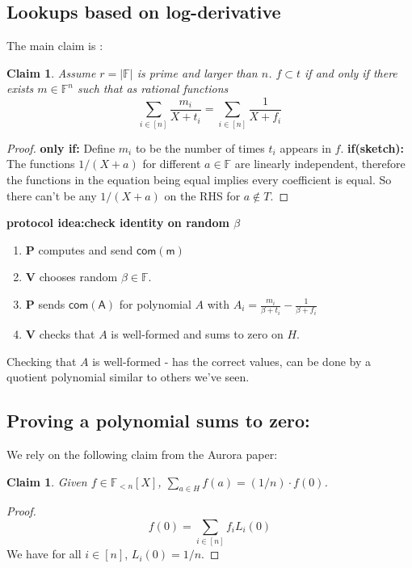 \documentclass[11pt]{article} %
\newcommand{\F}{\ensuremath{\mathbb F}\xspace}
\newcommand{\com}[1]{\ensuremath{\mathsf{com(#1)}}\xspace}
\newcommand{\prv}{\ensuremath{\mathsf{\mathbf{P}}}\xspace}
\newcommand{\ver}{\ensuremath{\mathsf{\mathbf{V}}}\xspace}
\newcommand{\polysofdeg}[1]{\ensuremath{\F_{< #1}[X]}\xspace}
\newcommand{\sumi}[1]{\sum_{i\in[#1]}}
\newtheorem{claim}[lemma]{Claim}
\begin{document}
\subsection{Lookups based on log-derivative}

The main claim is :

\begin{claim}
Assume $r=|\F|$ is prime and larger than $n$.
 $f\subset t$ if and only if there exists $m\in \F^n$ such that as rational functions
 \[\sum_{i\in [n]}\frac{m_i}{X+t_i}=\sumi{n}\frac{1}{X+f_i}\]
\end{claim}
\begin{proof}
 \textbf{only if:} Define $m_i$ to be the number of times $t_i$ appears in $f$.
 \textbf{if(sketch):} The functions $1/(X+a)$ for different $a\in \F$ are linearly independent,
 therefore the functions in the equation being equal implies every coefficient is equal.
 So there can't be any $1/(X+a)$ on the RHS for $a\notin T$.
\end{proof}


\textbf{protocol idea:check identity on random $\beta$}
\begin{enumerate}
 \item \prv computes and send \com{m}
 \item \ver chooses random $\beta\in \F$.
 \item \prv sends \com{A} for polynomial $A$ with $A_i=\frac{m_i}{\beta+t_i}-\frac{1}{\beta+f_i}$
 \item \ver checks that $A$ is well-formed and sums to zero on $H$.
\end{enumerate}

Checking that $A$ is well-formed - has the correct values, can be done by a quotient polynomial similar to others we've seen.

\subsection{Proving a polynomial sums to zero:}
We rely on the following claim from the Aurora paper:
\begin{claim}
 Given $f\in \polysofdeg{n}$,
 $\sum_{a\in H} f(a) = (1/n)\cdot f(0)$.
\end{claim}
\begin{proof}
 \[f(0)=\sumi{n}f_i L_i(0)\]
 We have for all $i\in [n]$, $L_i(0)=1/n$.
\end{proof}
\end{document}
